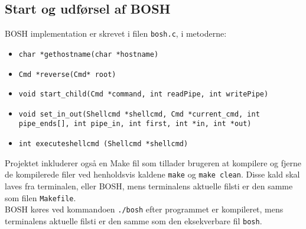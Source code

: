 \subsection{Start og udførsel af BOSH}
BOSH implementation er skrevet i filen \texttt{bosh.c}, i metoderne:
\begin{itemize}
	\item \texttt{char *gethostname(char *hostname)}
	\item \texttt{Cmd *reverse(Cmd* root)}
	\item \texttt{void start\_child(Cmd *command, int readPipe, int writePipe)}
	\item \texttt{void set\_in\_out(Shellcmd *shellcmd, Cmd *current\_cmd, int pipe\_ends[], int pipe\_in, int first, int *in, int *out)}
	\item \texttt{int executeshellcmd (Shellcmd *shellcmd)}
\end{itemize}

Projektet inkluderer også en Make fil som tillader brugeren at kompilere og fjerne de kompilerede filer ved henholdsvis kaldene \texttt{make} og \texttt{make clean}. Disse kald skal laves fra terminalen, eller BOSH, mens terminalens aktuelle filsti er den samme som filen \texttt{Makefile}.\\

BOSH køres ved kommandoen \texttt{./bosh} efter programmet er kompileret, mens terminalens aktuelle filsti er den samme som den eksekverbare fil \texttt{bosh}.
